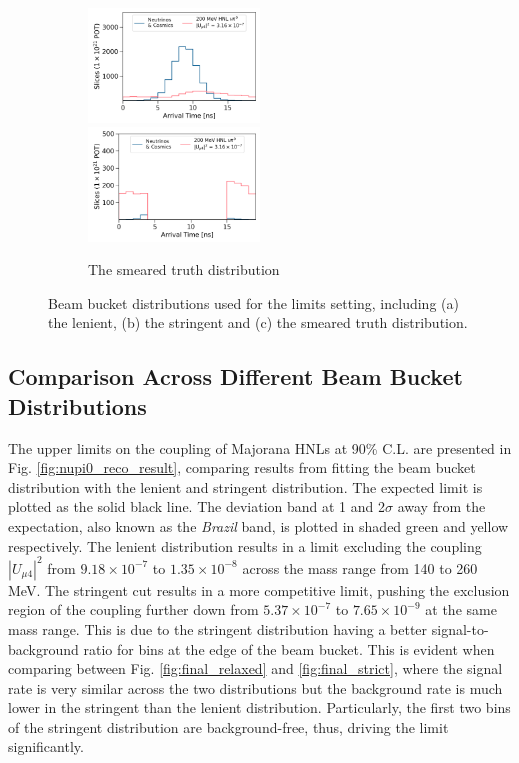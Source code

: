 \begin{figure}[htbp!]
\begin{subfigure}[b]{1.0\textwidth}
       	    \vspace{0.5cm}
        \end{subfigure}
        \begin{subfigure}[b]{1.0\textwidth}
            \includegraphics[width=0.5\textwidth]{smeared_truth}
            \includegraphics[width=0.5\textwidth]{smeared_truth_edge}
            \caption{The smeared truth distribution}%
	    \label{fig:final_truth}
     	    \vspace{0.5cm}
        \end{subfigure}
        \caption{
	Beam bucket distributions used for the limits setting, including (a) the lenient, (b) the stringent and (c) the smeared truth distribution.
	}
\end{figure}

\subsection{Comparison Across Different Beam Bucket Distributions}

The upper limits on the coupling of Majorana HNLs at 90\% C.L. are presented in Fig. \ref{fig:nupi0_reco_result}, comparing results from fitting the beam bucket distribution with the lenient and stringent distribution.
The expected limit is plotted as the solid black line.
The deviation band at 1 and 2$\sigma$ away from the expectation, also known as the \textit{Brazil} band, is plotted in shaded green and yellow respectively.
The lenient distribution results in a limit excluding the coupling $|U_{\mu4}|^2$ from $9.18 \times 10^{-7}$ to $1.35 \times 10^{-8}$ across the mass range from 140 to 260 MeV.
The stringent cut results in a more competitive limit, pushing the exclusion region of the coupling further down from $5.37 \times 10^{-7}$ to $7.65 \times 10^{-9}$ at the same mass range.
This is due to the stringent distribution having a better signal-to-background ratio for bins at the edge of the beam bucket.
This is evident when comparing between Fig. \ref{fig:final_relaxed} and \ref{fig:final_strict}, where the signal rate is very similar across the two distributions but the background rate is much lower in the stringent than the lenient distribution.
Particularly, the first two bins of the stringent distribution are background-free, thus, driving the limit significantly.


